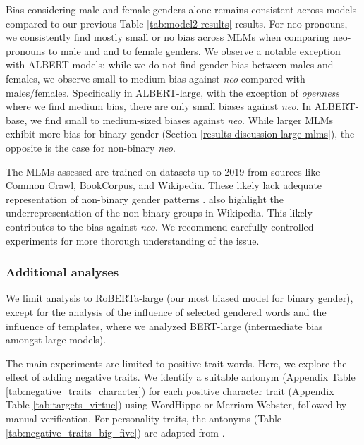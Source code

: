 Bias considering male and female genders alone remains consistent across models compared to our previous Table \ref{tab:model2-results} results.
%
For neo-pronouns, we consistently find mostly small or no bias across MLMs when comparing neo-pronouns to male and and to female genders.
%
We observe a notable exception with ALBERT models: while we do not find gender bias between males and females, we observe small to medium bias against \textit{neo} compared with males/females. 
%
Specifically in ALBERT-large, with the exception of \textit{openness} where we find medium bias, there are only small biases against \textit{neo}. In ALBERT-base, we find small to medium-sized biases against \textit{neo}.
While larger MLMs exhibit more bias for binary gender (Section \ref{results-discussion-large-mlms}), the opposite is the case for non-binary \textit{neo}.

The MLMs assessed are trained on datasets up to 2019 from sources like Common Crawl, BookCorpus, and Wikipedia. These likely lack adequate representation of non-binary gender patterns \cite{nozza-etal-2022-measuring}. \citet{mille-etal-2024-filling-gaps} also highlight the underrepresentation of the non-binary groups in Wikipedia. This likely contributes to the bias against \textit{neo}. We recommend carefully controlled experiments for more thorough understanding of the issue.

\subsubsection{Additional analyses}\label{additional-analysis}

\noindent We limit analysis to RoBERTa-large (our most biased model for binary gender), except for the analysis of the influence of selected gendered words and the influence of templates, where we analyzed BERT-large (intermediate bias amongst large models).

\label{negative-traits-analysis}

\noindent The main experiments are limited to positive trait words.
Here, we explore the effect of adding negative traits. We identify a suitable antonym (Appendix Table \ref{tab:negative_traits_character}) for each positive character trait 
(Appendix Table \ref{tab:targets_virtue}) 
using WordHippo or Merriam-Webster, followed by manual verification. For personality traits, the antonyms (Table \ref{tab:negative_traits_big_five}) are adapted from \citet{goldberg1992development}.


